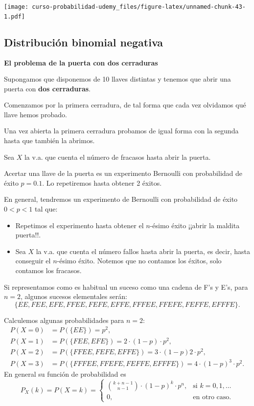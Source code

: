 \documentclass[]{book}
\providecommand{\tightlist}{%
  \setlength{\itemsep}{0pt}\setlength{\parskip}{0pt}}
\begin{document}
\texttt{[image: curso-probabilidad-udemy\_files/figure-latex/unnamed-chunk-43-1.pdf]}

\hypertarget{distribuciuxf3n-binomial-negativa}{%
\subsection{Distribución binomial negativa}\label{distribuciuxf3n-binomial-negativa}}

\textbf{El problema de la puerta con dos cerraduras}

Supongamos que disponemos de 10 llaves distintas y tenemos que abrir una puerta con \textbf{dos cerraduras}.

Comenzamos por la primera cerradura, de tal forma que cada vez olvidamos qué llave hemos probado.

Una vez abierta la primera cerradura probamos de igual forma con la segunda hasta que también la abrimos.

Sea \(X\) la v.a. que cuenta el número de fracasos hasta abrir la puerta.

Acertar una llave de la puerta es un experimento Bernoulli con probabilidad de éxito \(p=0.1\). Lo repetiremos hasta obtener 2 éxitos.

En general, tendremos un experimento de Bernoulli con probabilidad de éxito \(0<p<1\) tal que:

\begin{itemize}
\tightlist
\item
  Repetimos el experimento hasta obtener el \(n\)-ésimo éxito ¡¡abrir la maldita puerta!!.
\item
  Sea \(X\) la v.a. que cuenta el número fallos hasta abrir la puerta, es decir, hasta conseguir el \(n\)-ésimo éxito. Notemos que no contamos los éxitos, solo contamos los fracasos.
\end{itemize}

Si representamos como es habitual un suceso como una cadena de F's y E's, para \(n=2\), algunos sucesos elementales serán:
\[\{EE,FEE,EFE, FFEE,FEFE,EFFE,FFFEE,FFEFE,FEFFE,EFFFE\}.\]

Calculemos algunas probabilidades para \(n=2\):
\[
\begin{array}{rl}
P(X=0) & =P(\{EE\})=p^2, \\
P(X=1) & =P(\{FEE,EFE\})=2\cdot (1-p)\cdot p^2, \\
P(X=2) & =P(\{FFEE,FEFE,EFFE\})=3\cdot (1-p) 2\cdot p^2, \\
P(X=3) & =P(\{FFFEE,FFEFE,FEFFE,EFFFE\})=4\cdot (1-p)^3\cdot p^2.
\end{array}
\]
En general su función de probabilidad es
\[
P_{X}(k)=P(X=k)=\left\{\begin{array}{ll}
     {{k+n-1}\choose{n-1}} \cdot (1-p)^{k}\cdot p^n, & \mbox{si } k=0,1,\ldots\\
     0, & \mbox{en otro caso.}\end{array}\right.
\]
\end{document}
